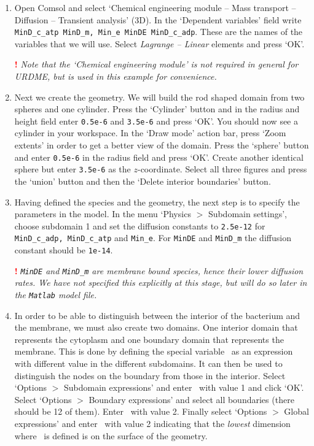 \begin{enumerate}
\item Open Comsol and select `Chemical engineering module -- Mass
  transport -- Diffusion -- Transient analysis' (3D). In the
  `Dependent variables' field write \texttt{MinD\_c\_atp MinD\_m,
  Min\_e MinDE MinD\_c\_adp}. These are the names of the variables
  that we will use. Select \emph{Lagrange -- Linear} elements and
  press `OK'.
  
    {\bf \textcolor{red}{!}} \emph{Note that the `Chemical engineering module' is not required 
    in general for URDME, but is used in this example for convenience.}


  \item Next we create the geometry. We will build the rod shaped
  domain from two spheres and one cylinder. Press the `Cylinder'
  button and in the radius and height field enter \texttt{0.5e-6} and
  \texttt{3.5e-6} and press `OK'. You should now see a cylinder in
  your workspace. In the `Draw mode' action bar, press `Zoom extents'
  in order to get a better view of the domain.  Press the `sphere'
  button and enter \texttt{0.5e-6} in the radius field and press
  `OK'. Create another identical sphere but enter \texttt{3.5e-6} as
  the $z$-coordinate. Select all three figures and press the `union'
  button and then the `Delete interior boundaries' button.

\item Having defined the species and the geometry, the next step is to
  specify the parameters in the model. In the menu `Physics $>$
  Subdomain settings', choose subdomain 1 and set the diffusion
  constants to \texttt{2.5e-12} for \texttt{MinD\_c\_adp,
    MinD\_c\_atp} and \texttt{Min\_e}. For \texttt{MinDE} and
  \texttt{MinD\_m} the diffusion constant should be \texttt{1e-14}.
  
  \smallskip 
   
  {\bf \textcolor{red}{!}} \emph{\texttt{MinDE} and \texttt{MinD\_m}
    are membrane bound species, hence their lower diffusion rates. We
    have not specified this explicitly at this stage, but will do so
    later in the \texttt{Matlab} model file.}

\item In order to be able to distinguish between the interior of the
  bacterium and the membrane, we must also create two domains. One
  interior domain that represents the cytoplasm and one boundary
  domain that represents the membrane. This is done by defining the
  special variable \varrdmesd\ as an expression with different value
  in the different subdomains. It can then be used to distinguish the
  nodes on the boundary from those in the interior. Select `Options
  $>$ Subdomain expressions' and enter \varrdmesd\ with value 1 and
  click `OK'. Select `Options $>$ Boundary expressions' and select all
  boundaries (there should be 12 of them). Enter \varrdmesd\ with
  value 2. Finally select `Options $>$ Global expressions' and enter
  \varrdmesdlevel\ with value 2 indicating that the \emph{lowest}
  dimension where \varrdmesd\ is defined is on the surface of the
  geometry.


\end{enumerate}
